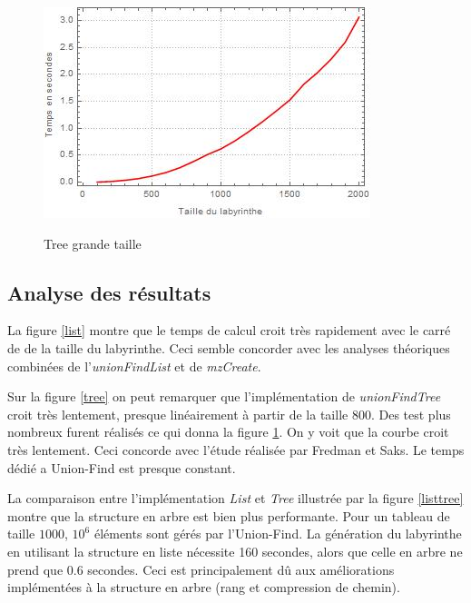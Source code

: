 \documentclass[11pt]{article}
\begin{document}
\begin{figure}[ht]
\begin{minipage}[h]{0.4\textwidth}
  \label{listtree}   
  \end{minipage}
  \hfill
  \begin{minipage}[h]{0.4\textwidth}
  \caption{Tree grande taille}
    \includegraphics[width=\textwidth]{Tree_big_graph.jpg}
  \label{treebig}
  \end{minipage}
\end{figure}

\subsection{Analyse des résultats}
La figure \ref{list} montre que le temps de calcul croit très rapidement avec le carré de de la taille du labyrinthe. Ceci semble concorder avec les analyses théoriques combinées de l'\emph{unionFindList} et de \emph{mzCreate}.

Sur la figure \ref{tree} on peut remarquer que l'implémentation de \emph{unionFindTree} croit très lentement, presque linéairement à partir de la taille 800. Des test plus nombreux furent réalisés ce qui donna la figure \ref{treebig}. On y voit que la courbe croit très lentement. Ceci concorde avec l'étude réalisée par Fredman et Saks. Le temps dédié a Union-Find est presque constant.

La comparaison entre l'implémentation \emph{List} et \emph{Tree} illustrée par la figure \ref{listtree} montre que la structure en arbre est bien plus performante. Pour un tableau de taille $1000$, $10^{6}$ éléments sont gérés par l'Union-Find. La génération du labyrinthe en utilisant la structure en liste nécessite 160 secondes, alors que celle en arbre ne prend que 0.6 secondes. Ceci est principalement dû aux améliorations implémentées à la structure en arbre (rang et compression de chemin).
\end{document}
